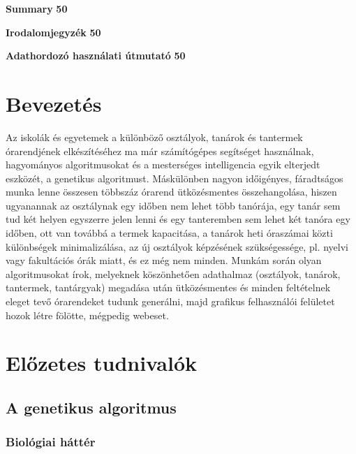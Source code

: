 \documentclass[a4paper,12pt]{article}
\begin{document}
\tableofcontents

\noindent \textbf{Summary} \hfill{\textbf{50}}

\noindent \textbf{Irodalomjegyzék} \hfill{\textbf{50}}

\noindent \textbf{Adathordozó használati útmutató} \hfill{\textbf{50}}

\section{Bevezetés}

Az iskolák és egyetemek a különböző osztályok, tanárok és tantermek órarendjének 
elkészítéséhez ma már számítógépes segítséget használnak, hagyományos algoritmusokat és a
mesterséges intelligencia egyik elterjedt eszközét, a genetikus algoritmust. Máskülönben 
nagyon időigényes, fáradtságos munka lenne összesen többszáz órarend ütközésmentes 
összehangolása, hiszen ugyanannak az osztálynak egy időben nem lehet több tanórája, egy tanár
sem tud két helyen egyszerre jelen lenni és egy tanteremben sem lehet két tanóra egy időben,
ott van továbbá a termek kapacitása, a tanárok heti óraszámai közti különbségek 
minimalizálása, az új osztályok képzésének szükségessége, pl. nyelvi vagy fakultációs órák 
miatt, és ez még nem minden. Munkám során olyan algoritmusokat írok, melyeknek köszönhetően 
adathalmaz (osztályok, tanárok, tantermek, tantárgyak) megadása után ütközésmentes és minden
feltételnek eleget tevő órarendeket tudunk generálni, majd grafikus felhasználói felületet 
hozok létre fölötte, mégpedig webeset.

\section{Előzetes tudnivalók}

\subsection{A genetikus algoritmus}

\subsubsection{Biológiai háttér}
\end{document}
